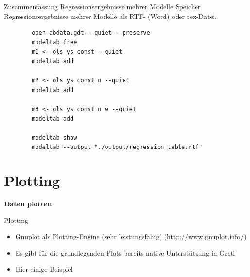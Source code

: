 \documentclass{beamer}[11pt]
\begin{document}
\begin{frame}[fragile]{Zusammenfassung Regressionsergebnisse mehrer Modelle}
	Speicher Regressionsergebnisse mehrer Modelle als RTF- (Word) oder tex-Datei.

	\scriptsize
	\begin{verbatim}
		open abdata.gdt --quiet --preserve
		modeltab free
		m1 <- ols ys const --quiet
		modeltab add

		m2 <- ols ys const n --quiet
		modeltab add

		m3 <- ols ys const n w --quiet
		modeltab add

		modeltab show
		modeltab --output="./output/regression_table.rtf"
	\end{verbatim}
\end{frame}



\section{Plotting}

\begin{frame}
	\centering
	\LARGE
	\textbf{Daten plotten}
\end{frame}

\begin{frame}{Plotting}
	\begin{itemize}
	  \item Gnuplot als Plotting-Engine (sehr leistungsfähig) (\url{http://www.gnuplot.info/})
	  \item Es gibt für die grundlegenden Plots bereits native Unterstützung in Gretl
	  \item Hier einige Beispiel
	\end{itemize}
\end{frame}
\end{document}
